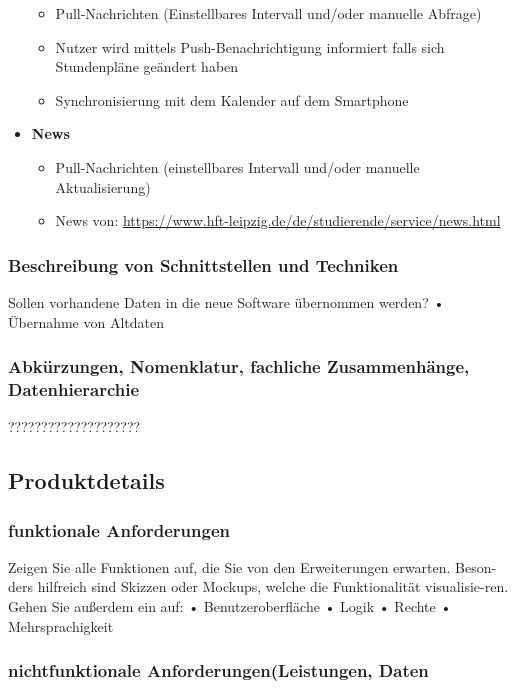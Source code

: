 \begin{itemize}
\begin{itemize}
				\item Pull-Nachrichten (Einstellbares Intervall und/oder manuelle Abfrage)
				\item Nutzer wird mittels Push-Benachrichtigung informiert falls sich Stundenpläne geändert haben
				\item Synchronisierung mit dem Kalender auf dem Smartphone
			\end{itemize}
		\item \textbf{News}
			\begin{itemize}
				\item Pull-Nachrichten (einstellbares Intervall und/oder manuelle Aktualisierung)
				\item News von: \url{https://www.hft-leipzig.de/de/studierende/service/news.html} 
			\end{itemize}
\end{itemize}				

\subsubsection{Beschreibung von Schnittstellen und Techniken}

Sollen vorhandene Daten in die neue Software übernommen werden? 
•	Übernahme von Altdaten 


\subsubsection{Abkürzungen, Nomenklatur, fachliche Zusammenhänge, Datenhierarchie}
????????????????????

\subsection{Produktdetails}

\subsubsection{funktionale Anforderungen}

Zeigen Sie alle Funktionen auf, die Sie von den Erweiterungen erwarten. Beson-ders hilfreich sind Skizzen oder Mockups, welche die Funktionalität visualisie-ren. Gehen Sie außerdem ein auf: 
•	Benutzeroberfläche
•	Logik
•	Rechte
•	Mehrsprachigkeit

\subsubsection{nichtfunktionale Anforderungen(Leistungen, Daten}


